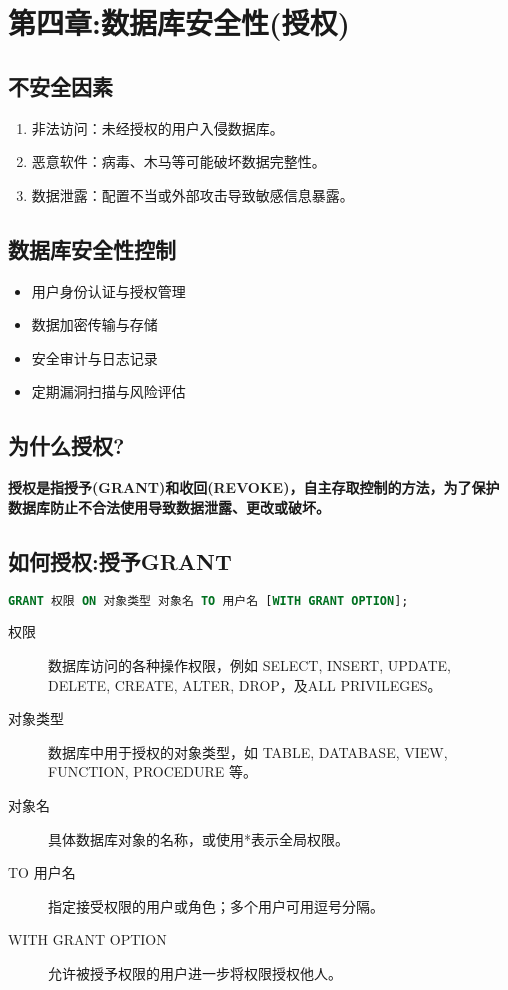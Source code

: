 \section{第四章:数据库安全性(授权)}
\subsection{不安全因素}
\begin{enumerate}
    \item 非法访问：未经授权的用户入侵数据库。
    \item 恶意软件：病毒、木马等可能破坏数据完整性。
    \item 数据泄露：配置不当或外部攻击导致敏感信息暴露。
\end{enumerate}

\subsection{数据库安全性控制}
\begin{itemize}
    \item 用户身份认证与授权管理
    \item 数据加密传输与存储
    \item 安全审计与日志记录
    \item 定期漏洞扫描与风险评估
\end{itemize}

\subsection{\color{red}\textbf{为什么授权?}}
\textbf{授权是指授予(GRANT)和收回(REVOKE)，自主存取控制的方法，为了保护数据库防止不合法使用导致数据泄露、更改或破坏。}

\subsection{\color{red}\textbf{如何授权:授予GRANT}}
\begin{lstlisting}[language=SQL]
    GRANT 权限 ON 对象类型 对象名 TO 用户名 [WITH GRANT OPTION];
\end{lstlisting}
\begin{description}
    \item[权限] 数据库访问的各种操作权限，例如 SELECT, INSERT, UPDATE, DELETE, CREATE, ALTER, DROP，及ALL PRIVILEGES。
    \item[对象类型] 数据库中用于授权的对象类型，如 TABLE, DATABASE, VIEW, FUNCTION, PROCEDURE 等。
    \item[对象名] 具体数据库对象的名称，或使用*表示全局权限。
    \item[TO 用户名] 指定接受权限的用户或角色；多个用户可用逗号分隔。
    \item[WITH GRANT OPTION] 允许被授予权限的用户进一步将权限授权他人。
\end{description}
